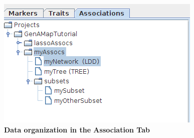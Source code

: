 \documentclass{article}
\begin{document}
\begin{figure}
\includegraphics[width=\textwidth]{associationTab.png}
\caption{\textbf{Data organization in the Association Tab}}
\label{associationTab}
\end{figure}

\pagebreak
\clearpage
\end{document}
